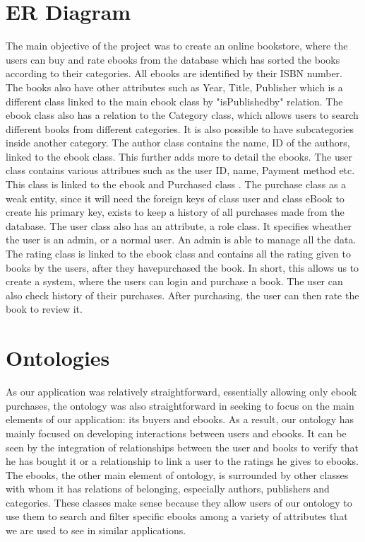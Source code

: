 \documentclass[a4paper,12pt]{article}
\begin{document}
\section{ER Diagram}
The main objective of the project was to create an online bookstore, where the users can buy and rate ebooks from the database which has sorted the books according to their categories.
All ebooks are identified by their ISBN number. The books also have other attributes such as Year, Title, Publisher which is a different class linked to the main ebook class by "isPublishedby" relation. The ebook class also has a relation to the Category class, which allows users to search different books from different categories. It is also possible to have subcategories inside another category. The author class contains the name, ID of the authors, linked to the ebook class. This further adds more to detail the ebooks.
The user class contains various attribues such as the user ID, name, Payment method etc. This class is linked to the ebook and Purchased class . The purchase class as a weak entity, since it will need the foreign keys of class user and class eBook to create his primary key, exists to keep a history of all purchases made from the database. The user class also has an attribute, a role class. It specifies wheather the user is an admin, or a normal user. An admin is able to manage all the data. 
The rating class is linked to the ebook class and contains all the rating given to books by the users, after they havepurchased the book.
In short, this allows us to create a system, where the users can login and purchase a book. The user can also check history of their purchases. After purchasing, the user can then rate the book to review it.

\section{Ontologies}
As our application was relatively straightforward, essentially allowing only ebook purchases, the ontology was also straightforward in seeking to focus on the main elements of our application: its buyers and ebooks. As a result, our ontology has mainly focused on developing interactions between users and ebooks. It can be seen by the integration of relationships between the user and books to verify that he has bought it or a relationship to link a user to the ratings he gives to ebooks. The ebooks, the other main element of ontology, is surrounded by other classes with whom it has relations of belonging, especially authors, publishers and categories. These classes make sense because they allow users of our ontology to use them to search and filter specific ebooks among a variety of attributes that we are used to see in similar applications.
\end{document}
